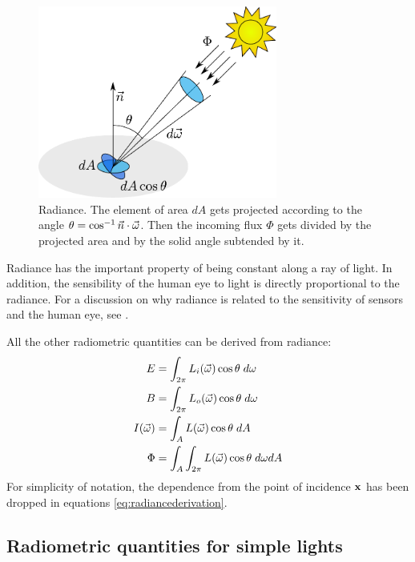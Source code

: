 \begin{figure}[!ht]
\centering
\includegraphics[width=0.7\textwidth]{images/radiance.pdf}
\caption{Radiance. The element of area $dA$ gets projected according to the angle $\theta = \cos^{-1}{\vec{n} \cdot \vec{\omega}}$. Then the incoming flux $\Phi$ gets divided by the projected area and by the solid angle subtended by it.}
\label{fig:radiance}
\end{figure}

Radiance has the important property of being constant along a ray of light. In addition, the sensibility of the human eye to light is directly proportional to the radiance. For a discussion on why radiance is related to the sensitivity of sensors and the human eye, see \cite{Cohen:1993:RRI:154731}.

All the other radiometric quantities can be derived from radiance:
\begin{equation}
\begin{split}
E &= \int_{2\pi} L_i(\vec{\omega}) \cos\theta \; d\omega \\
B &= \int_{2\pi} L_o(\vec{\omega}) \cos\theta \; d\omega \\
I(\vec{\omega}) &= \int_A L(\vec{\omega}) \cos\theta \; dA \\
\Phi &= \int_A \int_{2\pi} L(\vec{\omega}) \cos\theta \; d\omega dA
\end{split}
\label{eq:radiancederivation} 
\end{equation}
For simplicity of notation, the dependence from the point of incidence $\mathbf{x}$ has been dropped in equations \ref{eq:radiancederivation}. 

\subsection{Radiometric quantities for simple lights}

